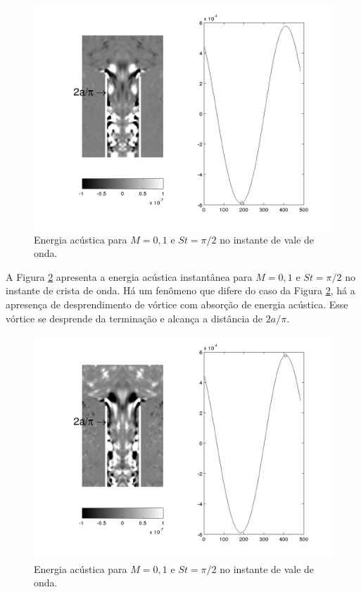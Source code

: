 \begin{figure}[ht!]
\centering
  \includegraphics[width=1.\linewidth]{figuras/max_01_1.png}
  \caption[Energia acústica para $M = 0,1$ e $St = \pi/2$ no instante de vale de onda.]{Energia acústica para $M = 0,1$ e $St = \pi/2$ no instante de vale de onda.}
  \label{fig:max_01_1}
\end{figure}

A Figura \ref{fig:max_01_3} apresenta a energia acústica instantânea para $M = 0,1$ e $St = \pi/2$ no instante de crista de onda. Há um fenômeno que difere do caso da Figura \ref{fig:max_01_3}, há a apresença de desprendimento de vórtice com absorção de energia acústica. Esse vórtice se desprende da terminação e alcança a distância de $2a/\pi$.

\newpage
\begin{figure}[ht!]
\centering
  \includegraphics[width=1.\linewidth]{figuras/max_01_3.png}
  \caption[Energia acústica para $M = 0,1$ e $St = \pi/2$ no instante de vale de onda.]{Energia acústica para $M = 0,1$ e $St = \pi/2$ no instante de vale de onda.}
  \label{fig:max_01_3}
\end{figure}

